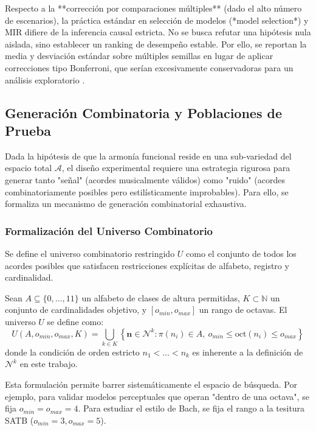 Respecto a la **corrección por comparaciones múltiples** (dado el alto número de escenarios), la práctica estándar en selección de modelos (*model selection*) y MIR difiere de la inferencia causal estricta. No se busca refutar una hipótesis nula aislada, sino establecer un ranking de desempeño estable. Por ello, se reportan la media y desviación estándar sobre múltiples semillas en lugar de aplicar correcciones tipo Bonferroni, que serían excesivamente conservadoras para un análisis exploratorio \cite{Micchi2020}.

\subsection{Generación Combinatoria y Poblaciones de Prueba}
\label{subsec:generacion_combinatoria}

Dada la hipótesis de que la armonía funcional reside en una sub-variedad del espacio total $\mathcal{A}$, el diseño experimental requiere una estrategia rigurosa para generar tanto "señal" (acordes musicalmente válidos) como "ruido" (acordes combinatoriamente posibles pero estilísticamente improbables). Para ello, se formaliza un mecanismo de generación combinatorial exhaustiva.

\subsubsection{Formalización del Universo Combinatorio}

Se define el universo combinatorio restringido $U$ como el conjunto de todos los acordes posibles que satisfacen restricciones explícitas de alfabeto, registro y cardinalidad.

\begin{definition}
Sean $A \subseteq \{0,\dots,11\}$ un alfabeto de clases de altura permitidas, $K \subset \mathbb{N}$ un conjunto de cardinalidades objetivo, y $[o_{min}, o_{max}]$ un rango de octavas. El universo $U$ se define como:
\begin{equation}
U(A, o_{min}, o_{max}, K) = \bigcup_{k \in K} \left\{ \mathbf{n} \in \mathcal{N}^k : \pi(n_i) \in A, \ o_{min} \leq \text{oct}(n_i) \leq o_{max} \right\}
\end{equation}
donde la condición de orden estricto $n_1 < \dots < n_k$ es inherente a la definición de $\mathcal{N}^k$ en este trabajo.
\end{definition}

Esta formulación permite barrer sistemáticamente el espacio de búsqueda. Por ejemplo, para validar modelos perceptuales que operan "dentro de una octava", se fija $o_{min}=o_{max}=4$. Para estudiar el estilo de Bach, se fija el rango a la tesitura SATB ($o_{min}=3, o_{max}=5$).

